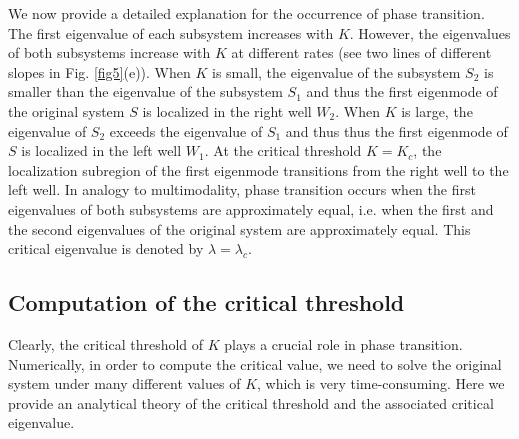 \documentclass[a4paper,11pt]{article}
\begin{document}
We now provide a detailed explanation for the occurrence of phase transition. The first eigenvalue of each subsystem increases with $K$. However, the eigenvalues of both subsystems increase with $K$ at different rates (see two lines of different slopes in Fig. \ref{fig5}(e)). When $K$ is small, the eigenvalue of the subsystem $S_2$ is smaller than the eigenvalue of the subsystem $S_1$ and thus the first eigenmode of the original system $S$ is localized in the right well $W_2$. When $K$ is large, the eigenvalue of $S_2$ exceeds the eigenvalue of $S_1$ and thus thus the first eigenmode of $S$ is localized in the left well $W_1$. At the critical threshold $K = K_c$, the localization subregion of the first eigenmode transitions from the right well to the left well. In analogy to multimodality, phase transition occurs when the first eigenvalues of both subsystems are approximately equal, i.e. when the first and the second eigenvalues of the original system are approximately equal. This critical eigenvalue is denoted by $\lambda = \lambda_c$.

\subsection{Computation of the critical threshold}
Clearly, the critical threshold of $K$ plays a crucial role in phase transition. Numerically, in order to compute the critical value, we need to solve the original system under many different values of $K$, which is very time-consuming. Here we provide an analytical theory of the critical threshold and the associated critical eigenvalue.
\end{document}
